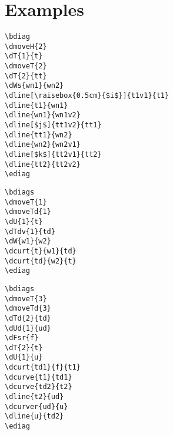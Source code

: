 \documentclass[a4paper]{article}
\begin{document}
\section{Examples}
 \begin{minipage}[b]{0.55\linewidth}\centering
  \begin{lstlisting}
\bdiag
\dmoveH{2}
\dT{1}{t}
\dmoveT{2}
\dT{2}{tt}
\dWs{wn1}{wn2}
\dline[\raisebox{0.5cm}{$i$}]{t1v1}{t1}
\dline{t1}{wn1}
\dline{wn1}{wn1v2}
\dline[$j$]{tt1v2}{tt1}
\dline{tt1}{wn2}
\dline{wn2}{wn2v1}
\dline[$k$]{tt2v1}{tt2}
\dline{tt2}{tt2v2}
\ediag
  \end{lstlisting}
 \end{minipage}
 \begin{minipage}[b]{0.45\linewidth}\centering
\bdiag
{}
\ediag
 \end{minipage}

 \begin{minipage}[b]{0.55\linewidth}\centering
  \begin{lstlisting}
\bdiags
\dmoveT{1}
\dmoveTd{1}
\dU{1}{t}
\dTdv{1}{td}
\dW{w1}{w2}
\dcurt{t}{w1}{td}
\dcurt{td}{w2}{t}
\ediag
  \end{lstlisting}
 \end{minipage}
 \begin{minipage}[b]{0.45\linewidth}\centering
\bdiags
{}
\ediag
 \end{minipage}

 \begin{minipage}[b]{0.55\linewidth}\centering
  \begin{lstlisting}
\bdiags
\dmoveT{3}
\dmoveTd{3}
\dTd{2}{td}
\dUd{1}{ud}
\dFsr{f}
\dT{2}{t}
\dU{1}{u}
\dcurt{td1}{f}{t1}
\dcurve{t1}{td1}
\dcurve{td2}{t2}
\dline{t2}{ud}
\dcurver{ud}{u}
\dline{u}{td2}
\ediag
  \end{lstlisting}
 \end{minipage}
 \begin{minipage}[b]{0.45\linewidth}\centering
\bdiags
{}
\ediag
 \end{minipage}
\end{document}
